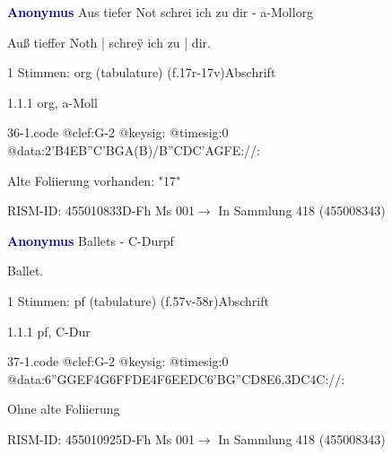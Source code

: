 \documentclass[twocolumn, 12pt]{book}
\begin{document}
\par \vspace{16pt} \textcolor{darkblue}{\textbf{Anonymus  }}\hfillplus{\textbf{[36]}}\newline Aus tiefer Not schrei ich zu dir - a-Moll\newline org
\par \begin{itshape}[f.17r, at left:] Auß tieffer Noth | schreÿ ich zu | dir.\end{itshape} 
\par \textcolor{darkblue}{}  1 Stimmen: org (tabulature)  (f.17r-17v)\newline Abschrift
\par 1.1.1  org, a-Moll  
\begin{filecontents*}{36-1.code}
@clef:G-2
@keysig:
@timesig:0
@data:2'B4EB''C'BGA(B)/B''CDC'AGFE://:
\end{filecontents*}
\newline %
\par Alte Foliierung vorhanden: "17"
\par RISM-ID: 455010833\newline D-Fh  Ms 001\newline $\rightarrow$ In Sammlung 418 (455008343)
      
\par \vspace{16pt} \textcolor{darkblue}{\textbf{Anonymus  }}\hfillplus{\textbf{[37]}}\newline Ballets - C-Dur\newline pf
\par \begin{itshape}[f.57v, at left:] Ballet.\end{itshape} 
\par \textcolor{darkblue}{}  1 Stimmen: pf (tabulature)  (f.57v-58r)\newline Abschrift
\par 1.1.1  pf, C-Dur  
\begin{filecontents*}{37-1.code}
@clef:G-2
@keysig:
@timesig:0
@data:{6''GGEF}4G{6FFDE}4F{6EEDC}{6'BG''CD}{8E6.3DC}4C://:
\end{filecontents*}
\newline %
\par Ohne alte Foliierung
\par RISM-ID: 455010925\newline D-Fh  Ms 001\newline $\rightarrow$ In Sammlung 418 (455008343)
      
\end{document}
